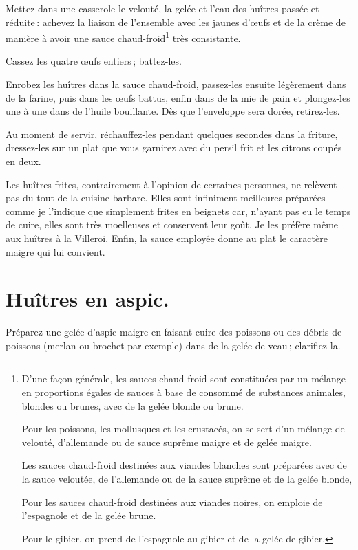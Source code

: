 Mettez dans une casserole le velouté, la gelée et l'eau des huîtres passée et
réduite : achevez la liaison de l'ensemble avec les jaunes d'œufs et de la
crème de manière à avoir une sauce chaud-froid\footnote{D'une façon générale,
les sauces chaud-froid sont constituées par un mélange en proportions égales de
sauces à base de consommé de substances animales, blondes ou brunes, avec de la
gelée blonde ou brune.

Pour les poissons, les mollusques et les crustacés, on se sert d'un mélange de
velouté, d'allemande ou de sauce suprême maigre et de gelée maigre.

Les sauces chaud-froid destinées aux viandes blanches sont préparées avec de la
sauce veloutée, de l'allemande ou de la sauce suprême et de la gelée blonde,

Pour les sauces chaud-froid destinées aux viandes noires, on emploie de
l'espagnole et de la gelée brune.

Pour le gibier, on prend de l'espagnole au gibier et de la gelée de gibier.}
très consistante.

Cassez les quatre œufs entiers ; battez-les.

Enrobez les huîtres dans la sauce chaud-froid, passez-les ensuite légèrement
dans de la farine, puis dans les œufs battus, enfin dans de la mie de pain et
plongez-les une à une dans de l'huile bouillante. Dès que l'enveloppe sera
dorée, retirez-les.

Au moment de servir, réchauffez-les pendant quelques secondes dans la friture,
dressez-les sur un plat que vous garnirez avec du persil frit et les citrons
coupés en deux.

Les huîtres frites, contrairement à l'opinion de certaines personnes, ne
relèvent pas du tout de la cuisine barbare. Elles sont infiniment meilleures
préparées comme je l'indique que simplement frites en beignets car, n'ayant pas
eu le temps de cuire, elles sont très moelleuses et conservent leur goût. Je
les préfère même aux huîtres à la Villeroi. Enfin, la sauce employée donne au
plat le caractère maigre qui lui convient.

\section*{\centering Huîtres en aspic.}

Préparez une gelée d'aspic maigre en faisant cuire des poissons ou des débris
de poissons (merlan ou brochet par exemple) dans de la gelée de veau ;
clarifiez-la.

